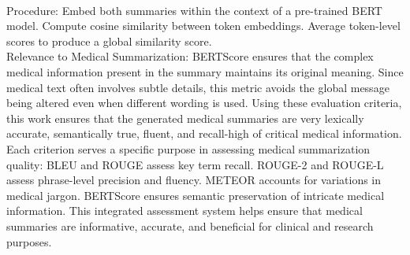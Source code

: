 \begin{enumerate}
\\
Procedure:
Embed both summaries within the context of a pre-trained BERT model.
Compute cosine similarity between token embeddings.
Average token-level scores to produce a global similarity score.
\\
Relevance to Medical Summarization: BERTScore ensures that the complex medical information present in the summary maintains its original meaning. Since medical text often involves subtle details, this metric avoids the global message being altered even when different wording is used.
Using these evaluation criteria, this work ensures that the generated medical summaries are very lexically accurate, semantically true, fluent, and recall-high of critical medical information. Each criterion serves a specific purpose in assessing medical summarization quality:
BLEU and ROUGE assess key term recall.
ROUGE-2 and ROUGE-L assess phrase-level precision and fluency.
METEOR accounts for variations in medical jargon.
BERTScore ensures semantic preservation of intricate medical information.
This integrated assessment system helps ensure that medical summaries are informative, accurate, and beneficial for clinical and research purposes.
\end{enumerate}
